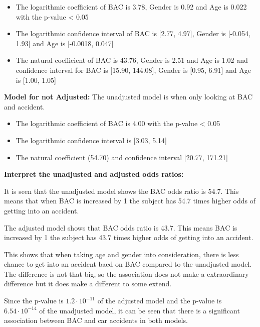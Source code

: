 \begin{itemize}

\item The logarithmic coefficient of BAC is 3.78, Gender is 0.92 and Age is 0.022 with the p-value < 0.05

\item The logarithmic confidence interval of BAC is [2.77, 4.97], Gender is [-0.054, 1.93] and Age is [-0.0018, 0.047]

\item The natural coefficient of BAC is 43.76, Gender is 2.51 and Age is 1.02 and confidence interval for BAC is [15.90, 144.08], Gender is [0.95, 6.91] and Age is [1.00, 1.05]

\end{itemize}


\textbf{Model for not Adjusted:}
The unadjusted model is when only looking at BAC and accident. 

\begin{itemize}

\item The logarithmic coefficient of BAC is 4.00 with the p-value < 0.05
\item The logarithmic confidence interval is [3.03, 5.14]
\item The natural coefficient (54.70) and confidence interval [20.77, 171.21]

\end{itemize}

\textbf{Interpret the unadjusted and adjusted odds ratios:}

It is seen that the unadjusted model shows the BAC odds ratio is 54.7. This means that when BAC is increased by 1 the subject has 54.7 times higher odds of getting into an accident. 

The adjusted model shows that BAC odds ratio is 43.7. This means BAC is increased by 1 the subject has 43.7 times higher odds of getting into an accident. 

This shows that when taking age and gender into consideration, there is less chance to get into an accident baed on BAC compared to the unadjusted model. The difference is not that big, so the association does not make a extraordinary difference but it does make a different to some extend.

Since the p-value is $1.2 \cdot 10^{-11}$ of the adjusted model and the p-value is $6.54 \cdot 10^{-14}$ of the unadjusted model, it can be seen that there is a significant association between BAC and car accidents in both models. 


